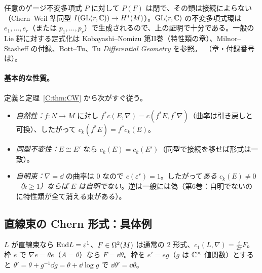 \begin{rem}[出典と一般の不変多項式]
任意のゲージ不変多項式 $P$ に対して $P(F)$ は閉で、その類は接続によらない（Chern--Weil 準同型 $I(\mathrm{GL}(r,\mathbb C))\to H^*(M)$）。$\mathrm{GL}(r,\mathbb C)$ の不変多項式環は $e_1,\dots,e_r$（または $p_1,\dots,p_r$）で生成されるので、上の証明で十分である。一般の Lie 群に対する定式化は Kobayashi--Nomizu 第II巻（特性類の章）、Milnor--Stasheff の付録、Bott--Tu、Tu \emph{Differential Geometry} を参照。\tC\ （章・付録番号は\tQ）。
\end{rem}

\paragraph{基本的な性質。}定義と定理~\ref{C:thm:CW} から次がすぐ従う。
\begin{itemize}
\item \emph{自然性：}$f:N\to M$ に対し $f^*c(E,\nabla)=c(f^*E,f^*\nabla)$（曲率は引き戻しと可換）、したがって $c_k(f^*E)=f^*c_k(E)$。
\item \emph{同型不変性：}$E\cong E'$ なら $c_k(E)=c_k(E')$（同型で接続を移せば形式は一致）。
\item \emph{自明束：}$\nabla=\dd$ の曲率は $0$ なので $c(\varepsilon^r)=1$。したがって\emph{ある $c_k(E)\ne0$（$k\ge1$）ならば $E$ は自明でない}。逆は一般には偽（第6巻：自明でないのに特性類が全て消える束がある）。
\end{itemize}

\subsection{直線束の Chern 形式：具体例}
$L$ が直線束なら $\mathrm{End} L=\varepsilon^1$、$F\in\Omega^2(M)$ は通常の 2 形式、$c_1(L,\nabla)=\frac i{2\pi}F$。枠 $e$ で $\nabla e=\theta e$（$A=\theta$）なら $F=\dd\theta$。枠を $e'=eg$（$g$ は $\mathbb C^\times$ 値関数）とすると $\theta'=\theta+g^{-1}\dd g=\theta+\dd\log g$ で $\dd\theta'=\dd\theta$。

